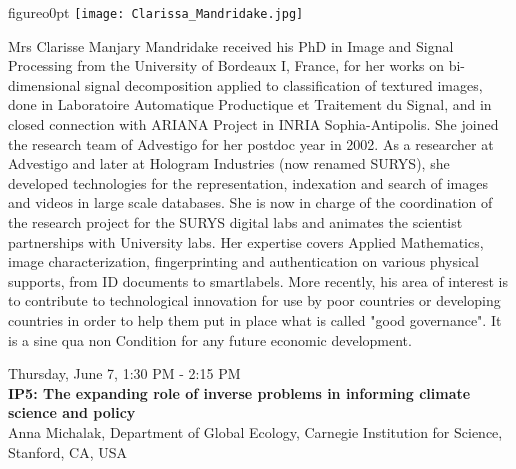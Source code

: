 \begin{wrapfloat}{figure}{o}{0pt}
\texttt{[image: Clarissa\_Mandridake.jpg]}
\end{wrapfloat}
Mrs Clarisse Manjary Mandridake received his PhD in Image and Signal Processing from the University of Bordeaux I, France, for her works on bi-dimensional signal decomposition applied to classification of textured images, done in Laboratoire Automatique Productique et Traitement du Signal, and in closed connection with ARIANA Project in INRIA Sophia-Antipolis. She joined the research team of Advestigo for her postdoc year in 2002. As a researcher at Advestigo and later at Hologram Industries (now renamed SURYS), she developed technologies for the representation, indexation and search of images and videos in large scale databases. She is now in charge of the coordination of the research project for the SURYS digital labs and animates the scientist partnerships with University labs. Her expertise covers Applied Mathematics, image characterization, fingerprinting and authentication on various physical supports, from ID documents to smartlabels. More recently, his area of interest is to contribute to technological innovation for use by poor countries or developing countries in order to help them put in place what is called "good governance". It is a sine qua non Condition for any future economic development.


\newpage\vspace{2cm}
\begin{center}{\Large{
Thursday, June 7, 1:30 PM - 2:15 PM \\
\textbf{IP5: The expanding role of inverse problems in informing climate science and policy}\\
Anna Michalak, Department of Global Ecology, Carnegie Institution for Science, Stanford, CA, USA}}
\end{center}
\vspace{1cm}

